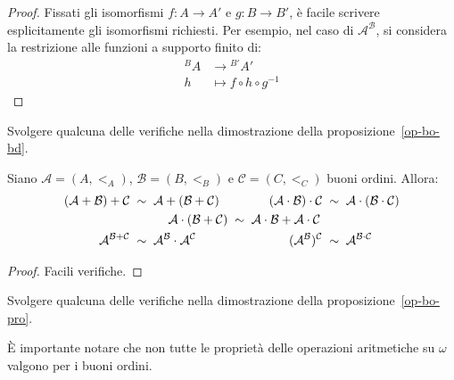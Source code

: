 \begin{proof}
	Fissati gli isomorfismi $f\colon A \to A'$ e $g \colon B \to B'$, \`e facile scrivere esplicitamente gli isomorfismi richiesti. Per esempio, nel caso di $\mathcal{A}^{\mathcal{B}}$, si considera la restrizione alle funzioni a supporto finito di:
	\begin{align*}
{}^{B}A &\to {}^{B'}A'\\
h &\mapsto f \circ h \circ g^{-1}
		\end{align*}
\end{proof}

\begin{exercise}
Svolgere qualcuna delle verifiche nella dimostrazione della proposizione~\ref{op-bo-bd}.
\end{exercise}

\begin{proposition}\label{op-bo-pro}
	Siano $\mathcal{A} = (A,<_A)$, $\mathcal{B} = (B,<_B)$ e $\mathcal{C} = (C,<_C)$ buoni ordini. Allora:
\begin{alignat*}{3}
(\mathcal A + \mathcal B) + \mathcal C \;&\sim\; \mathcal A +
(\mathcal B + \mathcal C) \quad &&\quad &(\mathcal A \cdot \mathcal B) \cdot
\mathcal C \;&\sim\; \mathcal A \cdot (\mathcal B \cdot \mathcal C)\\
&&&\mathclap{\mathcal A \cdot (\mathcal B + \mathcal C) \;\sim\;
\mathcal A \cdot \mathcal B + \mathcal A \cdot \mathcal C} \\
{\mathcal A}^{\mathcal B + \mathcal C} \;&\sim\; \mathcal A^{\mathcal
B} \cdot {\mathcal A}^{\mathcal C} &&& ({\mathcal A}^{\mathcal
B})^{\mathcal{C}} \;&\sim\; {\mathcal A}^{\mathcal B \cdot \mathcal C}
\end{alignat*}
\end{proposition}

\begin{proof}
	Facili verifiche.
\end{proof}

\begin{exercise}
Svolgere qualcuna delle verifiche nella dimostrazione della
proposizione~\ref{op-bo-pro}.
\end{exercise}

\`E importante notare che non tutte le propriet\`a delle operazioni aritmetiche su $\omega$ valgono per i buoni ordini.

